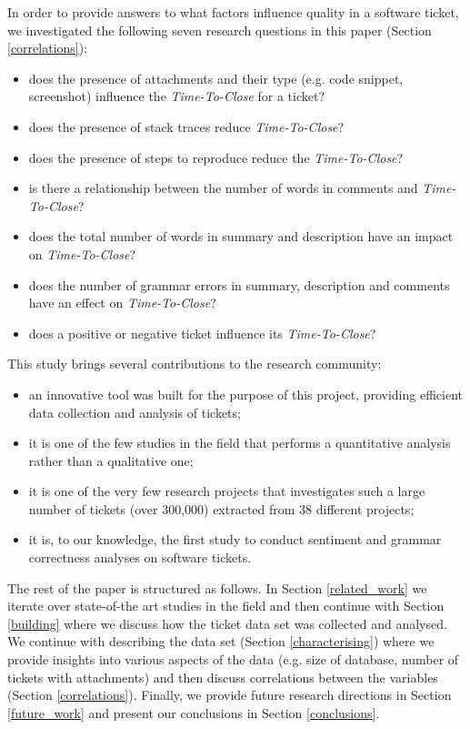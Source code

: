 \documentclass{mpaper}
\begin{document}
In order to provide answers to what factors influence quality in a software ticket, we investigated the following seven research 
questions in this paper (Section \ref{correlations}):
\begin{itemize}
  \item does the presence of attachments and their type (e.g. code snippet, screenshot) influence the \emph{Time-To-Close} for 
  a ticket?
  \item does the presence of stack traces reduce \emph{Time-To-Close}?
  \item does the presence of steps to reproduce reduce the \emph{Time-To-Close}?
  \item is there a relationship between the number of words in comments and \emph{Time-To-Close}?
  \item does the total number of words in summary and description have an impact on \emph{Time-To-Close}?
  \item does the number of grammar errors in summary, description and comments have an effect on \emph{Time-To-Close}?
  \item does a positive or negative ticket influence its \emph{Time-To-Close}?
\end{itemize}

This study brings several contributions to the research community:
\begin{itemize}
  \item an innovative tool was built for the purpose of this project, providing efficient data collection and analysis of
  tickets;
  \item it is one of the few studies in the field that performs a quantitative analysis rather than a qualitative one;
  \item it is one of the very few research projects that investigates such a large number of tickets (over 300,000)
  extracted from 38 different projects;
  \item it is, to our knowledge, the first study to conduct sentiment and grammar correctness analyses on software tickets.
\end{itemize}

The rest of the paper is structured as follows. In Section \ref{related_work} we iterate over state-of-the art studies in 
the field and then continue with Section \ref{building} where we discuss how the ticket data set was collected and 
analysed. We continue with describing the data set (Section \ref{characterising}) where we provide insights into various 
aspects of the data (e.g. size of database, number of tickets with attachments) and then discuss correlations between 
the variables (Section \ref{correlations}). Finally, we provide future research directions in Section \ref{future_work} 
and present our conclusions in Section \ref{conclusions}.
\end{document}
